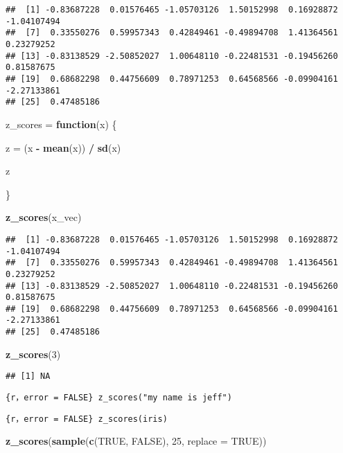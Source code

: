 \documentclass[
]{article}
\newenvironment{Shaded}{\begin{snugshade}}{\end{snugshade}}
\newcommand{\AttributeTok}[1]{\textcolor[rgb]{0.13,0.29,0.53}{#1}}
\newcommand{\ConstantTok}[1]{\textcolor[rgb]{0.56,0.35,0.01}{#1}}
\newcommand{\ControlFlowTok}[1]{\textcolor[rgb]{0.13,0.29,0.53}{\textbf{#1}}}
\newcommand{\DecValTok}[1]{\textcolor[rgb]{0.00,0.00,0.81}{#1}}
\newcommand{\FunctionTok}[1]{\textcolor[rgb]{0.13,0.29,0.53}{\textbf{#1}}}
\newcommand{\NormalTok}[1]{#1}
\newcommand{\OtherTok}[1]{\textcolor[rgb]{0.56,0.35,0.01}{#1}}
\newcommand{\SpecialCharTok}[1]{\textcolor[rgb]{0.81,0.36,0.00}{\textbf{#1}}}
\begin{document}
\begin{verbatim}
##  [1] -0.83687228  0.01576465 -1.05703126  1.50152998  0.16928872 -1.04107494
##  [7]  0.33550276  0.59957343  0.42849461 -0.49894708  1.41364561  0.23279252
## [13] -0.83138529 -2.50852027  1.00648110 -0.22481531 -0.19456260  0.81587675
## [19]  0.68682298  0.44756609  0.78971253  0.64568566 -0.09904161 -2.27133861
## [25]  0.47485186
\end{verbatim}

\begin{Shaded}
\begin{Highlighting}[]
\NormalTok{z\_scores }\OtherTok{=} \ControlFlowTok{function}\NormalTok{(x) \{}
  
\NormalTok{  z }\OtherTok{=}\NormalTok{ (x }\SpecialCharTok{{-}} \FunctionTok{mean}\NormalTok{(x)) }\SpecialCharTok{/} \FunctionTok{sd}\NormalTok{(x)}
  
\NormalTok{  z}
  
\NormalTok{\}}

\FunctionTok{z\_scores}\NormalTok{(x\_vec)}
\end{Highlighting}
\end{Shaded}

\begin{verbatim}
##  [1] -0.83687228  0.01576465 -1.05703126  1.50152998  0.16928872 -1.04107494
##  [7]  0.33550276  0.59957343  0.42849461 -0.49894708  1.41364561  0.23279252
## [13] -0.83138529 -2.50852027  1.00648110 -0.22481531 -0.19456260  0.81587675
## [19]  0.68682298  0.44756609  0.78971253  0.64568566 -0.09904161 -2.27133861
## [25]  0.47485186
\end{verbatim}

\begin{Shaded}
\begin{Highlighting}[]
\FunctionTok{z\_scores}\NormalTok{(}\DecValTok{3}\NormalTok{)}
\end{Highlighting}
\end{Shaded}

\begin{verbatim}
## [1] NA
\end{verbatim}

\texttt{\{r，error\ =\ FALSE\}\ z\_scores("my\ name\ is\ jeff")}

\texttt{\{r，error\ =\ FALSE\}\ z\_scores(iris)}

\begin{Shaded}
\begin{Highlighting}[]
\FunctionTok{z\_scores}\NormalTok{(}\FunctionTok{sample}\NormalTok{(}\FunctionTok{c}\NormalTok{(}\ConstantTok{TRUE}\NormalTok{, }\ConstantTok{FALSE}\NormalTok{), }\DecValTok{25}\NormalTok{, }\AttributeTok{replace =} \ConstantTok{TRUE}\NormalTok{))}
\end{Highlighting}
\end{Shaded}
\end{document}
